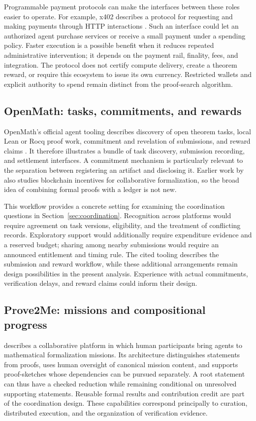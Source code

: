 \documentclass[11pt,a4paper]{article}
\begin{document}
Programmable payment protocols can make the interfaces between these roles easier to operate. For example, x402 describes a protocol for requesting and making payments through HTTP interactions \citep{x402}. Such an interface could let an authorized agent purchase services or receive a small payment under a spending policy. Faster execution is a possible benefit when it reduces repeated administrative intervention; it depends on the payment rail, finality, fees, and integration. The protocol does not certify compute delivery, create a theorem reward, or require this ecosystem to issue its own currency. Restricted wallets and explicit authority to spend remain distinct from the proof-search algorithm.

\subsection{OpenMath: tasks, commitments, and rewards}
OpenMath's official agent tooling describes discovery of open theorem tasks, local Lean or Rocq proof work, commitment and revelation of submissions, and reward claims \citep{openmath}. It therefore illustrates a bundle of task discovery, submission recording, and settlement interfaces. A commitment mechanism is particularly relevant to the separation between registering an artifact and disclosing it. Earlier work by \citet{lim} also studies blockchain incentives for collaborative formalization, so the broad idea of combining formal proofs with a ledger is not new.

This workflow provides a concrete setting for examining the coordination questions in Section~\ref{sec:coordination}. Recognition across platforms would require agreement on task versions, eligibility, and the treatment of conflicting records. Exploratory support would additionally require expenditure evidence and a reserved budget; sharing among nearby submissions would require an announced entitlement and timing rule. The cited tooling describes the submission and reward workflow, while these additional arrangements remain design possibilities in the present analysis. Experience with actual commitments, verification delays, and reward claims could inform their design.

\subsection{Prove2Me: missions and compositional progress}
\citet{prove2me} describes a collaborative platform in which human participants bring agents to mathematical formalization missions. Its architecture distinguishes statements from proofs, uses human oversight of canonical mission content, and supports proof-sketches whose dependencies can be pursued separately. A root statement can thus have a checked reduction while remaining conditional on unresolved supporting statements. Reusable formal results and contribution credit are part of the coordination design. These capabilities correspond principally to curation, distributed execution, and the organization of verification evidence.
\end{document}

